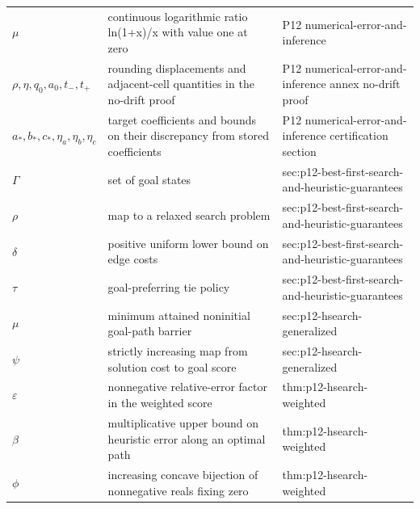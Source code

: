 \begin{longtable}{@{}p{}p{}p{}@{}}
\(\mu\) & continuous logarithmic ratio ln(1+x)/x with value one at zero & P12 numerical-\allowbreak{}error-\allowbreak{}and-\allowbreak{}inference \\
\(\rho,\allowbreak \eta,\allowbreak q_0,\allowbreak a_0,\allowbreak t_-,\allowbreak t_+\) & rounding displacements and adjacent-cell quantities in the no-drift proof & P12 numerical-\allowbreak{}error-\allowbreak{}and-\allowbreak{}inference annex no-\allowbreak{}drift proof \\
\(a_*,\allowbreak b_*,\allowbreak c_*,\allowbreak \eta_a,\allowbreak \eta_b,\allowbreak \eta_c\) & target coefficients and bounds on their discrepancy from stored coefficients & P12 numerical-\allowbreak{}error-\allowbreak{}and-\allowbreak{}inference certification section \\
\(\Gamma\) & set of goal states & sec:\allowbreak{}p12-\allowbreak{}best-\allowbreak{}first-\allowbreak{}search-\allowbreak{}and-\allowbreak{}heuristic-\allowbreak{}guarantees \\
\(\rho\) & map to a relaxed search problem & sec:\allowbreak{}p12-\allowbreak{}best-\allowbreak{}first-\allowbreak{}search-\allowbreak{}and-\allowbreak{}heuristic-\allowbreak{}guarantees \\
\(\delta\) & positive uniform lower bound on edge costs & sec:\allowbreak{}p12-\allowbreak{}best-\allowbreak{}first-\allowbreak{}search-\allowbreak{}and-\allowbreak{}heuristic-\allowbreak{}guarantees \\
\(\tau\) & goal-preferring tie policy & sec:\allowbreak{}p12-\allowbreak{}best-\allowbreak{}first-\allowbreak{}search-\allowbreak{}and-\allowbreak{}heuristic-\allowbreak{}guarantees \\
\(\mu\) & minimum attained noninitial goal-path barrier & sec:\allowbreak{}p12-\allowbreak{}hsearch-\allowbreak{}generalized \\
\(\psi\) & strictly increasing map from solution cost to goal score & sec:\allowbreak{}p12-\allowbreak{}hsearch-\allowbreak{}generalized \\
\(\varepsilon\) & nonnegative relative-error factor in the weighted score & thm:\allowbreak{}p12-\allowbreak{}hsearch-\allowbreak{}weighted \\
\(\beta\) & multiplicative upper bound on heuristic error along an optimal path & thm:\allowbreak{}p12-\allowbreak{}hsearch-\allowbreak{}weighted \\
\(\phi\) & increasing concave bijection of nonnegative reals fixing zero & thm:\allowbreak{}p12-\allowbreak{}hsearch-\allowbreak{}weighted \\

\end{longtable}
